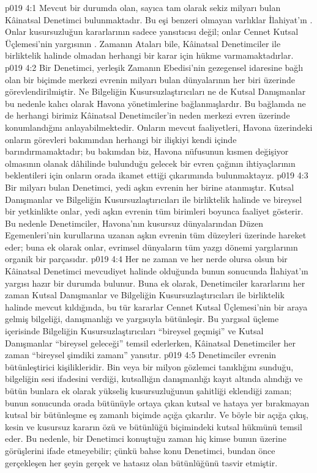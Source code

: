 \vs p019 4:1 Mevcut bir durumda olan, sayıca tam olarak sekiz milyarı bulan Kâinatsal Denetimci bulunmaktadır. Bu eşi benzeri olmayan varlıklar İlahiyat’ın . Onlar kusursuzluğun kararlarının sadece yansıtıcısı değil; onlar Cennet Kutsal Üçlemesi’nin yargısının . Zamanın Ataları bile, Kâinatsal Denetimciler ile birliktelik halinde olmadan herhangi bir karar için hükme varmamaktadırlar.
\vs p019 4:2 Bir Denetimci, yerleşik Zamanın Ebedisi’nin gezegensel idaresine bağlı olan bir biçimde merkezi evrenin milyarı bulan dünyalarının her biri üzerinde görevlendirilmiştir. Ne Bilgeliğin Kusursuzlaştırıcıları ne de Kutsal Danışmanlar bu nedenle kalıcı olarak Havona yönetimlerine bağlanmışlardır. Bu bağlamda ne de herhangi birimiz Kâinatsal Denetimciler’in neden merkezi evren üzerinde konumlandığını anlayabilmektedir. Onların mevcut faaliyetleri, Havona üzerindeki onların görevleri bakımından herhangi bir ilişkiyi kendi içinde barındırmamaktadır; bu bakımdan biz, Havona nüfusunun kısmen değişiyor olmasının olanak dâhilinde bulunduğu gelecek bir evren çağının ihtiyaçlarının beklentileri için onların orada ikamet ettiği çıkarımında bulunmaktayız.
\vs p019 4:3 Bir milyarı bulan Denetimci, yedi aşkın evrenin her birine atanmıştır. Kutsal Danışmanlar ve Bilgeliğin Kusursuzlaştırıcıları ile birliktelik halinde ve bireysel bir yetkinlikte onlar, yedi aşkın evrenin tüm birimleri boyunca faaliyet gösterir. Bu nedenle Denetimciler, Havona’nın kusursuz dünyalarından Düzen Egemenleri’nin kurullarına uzanan aşkın evrenin tüm düzeyleri üzerinde hareket eder; buna ek olarak onlar, evrimsel dünyaların tüm yazgı dönemi yargılarının organik bir parçasıdır.
\vs p019 4:4 Her ne zaman ve her nerde olursa olsun bir Kâinatsal Denetimci mevcudiyet halinde olduğunda bunun sonucunda İlahiyat’ın yargısı hazır bir durumda bulunur. Buna ek olarak, Denetimciler kararlarını her zaman Kutsal Danışmanlar ve Bilgeliğin Kusursuzlaştırıcıları ile birliktelik halinde mevcut kıldığında, bu tür kararlar Cennet Kutsal Üçlemesi’nin bir araya gelmiş bilgeliği, danışmanlığı ve yargısıyla bütünleşir. Bu yargısal üçleme içerisinde Bilgeliğin Kusursuzlaştırıcıları “bireysel geçmişi” ve Kutsal Danışmanlar “bireysel geleceği” temsil ederlerken, Kâinatsal Denetimciler her zaman “bireysel şimdiki zamanı” yansıtır.
\vs p019 4:5 Denetimciler evrenin bütünleştirici kişilikleridir. Bin veya bir milyon gözlemci tanıklığını sunduğu, bilgeliğin sesi ifadesini verdiği, kutsallığın danışmanlığı kayıt altında alındığı ve bütün bunlara ek olarak yükseliş kusursuzluğunun şahitliği eklendiği zaman; bunun sonucunda orada bütünüyle ortaya çıkan kutsal ve hataya yer bırakmayan kutsal bir bütünleşme eş zamanlı biçimde açığa çıkarılır. Ve böyle bir açığa çıkış, kesin ve kusursuz kararın özü ve bütünlüğü biçimindeki kutsal hükmünü temsil eder. Bu nedenle, bir Denetimci konuştuğu zaman hiç kimse bunun üzerine görüşlerini ifade etmeyebilir; çünkü bahse konu Denetimci, bundan önce gerçekleşen her şeyin gerçek ve hatasız olan bütünlüğünü tasvir etmiştir.
